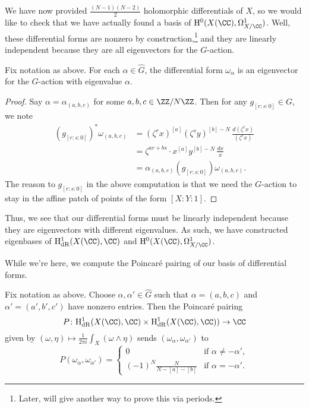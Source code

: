\documentclass[../thesis.tex]{subfiles}
\begin{document}
We have now provided $\frac{(N-1)(N-2)}2$ holomorphic differentials of $X$, so we would like to check that we have actually found a basis of $\mathrm H^0(X(\CC),\Omega^1_{X/\CC})$. Well, these differential forms are nonzero by construction,\footnote{Later,  will give another way to prove this via periods.} and they are linearly independent because they are all eigenvectors for the $G$-action.
\begin{lemma}
	Fix notation as above. For each $\alpha\in\widehat G$, the differential form $\omega_\alpha$ is an eigenvector for the $G$-action with eigenvalue $\alpha$.
\end{lemma}
\begin{proof}
	Say $\alpha=\alpha_{(a,b,c)}$ for some $a,b,c\in\ZZ/N\ZZ$. Then for any $g_{[r:s:0]}\in G$, we note
	\begin{align*}
		(g_{[r:s:0]})^*\omega_{(a,b,c)} &= (\zeta^rx)^{[a]}(\zeta^sy)^{[b]-N}\,\frac{d(\zeta^rx)}{(\zeta^rx)} \\
		&= \zeta^{ar+bs}\cdot x^{[a]}y^{[b]-N}\,\frac{dx}x \\
		&= \alpha_{(a,b,c)}(g_{[r:s:0]})\omega_{(a,b,c)}.
	\end{align*}
	The reason to $g_{[r:s:0]}$ in the above computation is that we need the $G$-action to stay in the affine patch of points of the form $[X:Y:1]$.
\end{proof}
\begin{remark} \label{rem:diagonalize-de-rham}
	Thus, we see that our differential forms must be linearly independent because they are eigenvectors with different eigenvalues. As such, we have constructed eigenbases of $\mathrm H^1_{\mathrm{dR}}(X(\CC),\CC)$ and $\mathrm H^0(X(\CC),\Omega^1_{X/\CC})$.
\end{remark}
While we're here, we compute the Poincar\'e pairing of our basis of differential forms. 
\begin{lemma}
	Fix notation as above. Choose $\alpha,\alpha'\in\widehat G$ such that $\alpha=(a,b,c)$ and $\alpha'=(a',b',c')$ have nonzero entries. Then the Poincar\'e pairing
	\[P\colon\mathrm H^1_{\mathrm{dR}}(X(\CC),\CC)\times\mathrm H^1_{\mathrm{dR}}(X(\CC),\CC))\to\CC\]
	given by $(\omega,\eta)\mapsto\frac1{2\pi i}\int_X(\omega\land\eta)$ sends $(\omega_\alpha,\omega_{\alpha'})$ to
	\[P(\omega_\alpha,\omega_{\alpha'})=\begin{cases}
		0 & \text{if }\alpha\ne-\alpha', \\
		(-1)^N\frac N{N-[a]-[b]} & \text{if }\alpha=-\alpha'.
	\end{cases}\]
\end{lemma}
\end{document}
